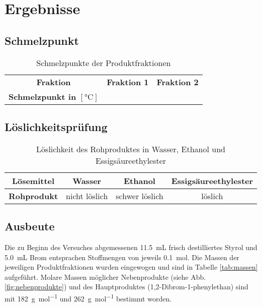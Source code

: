 \newpage
\section{Ergebnisse}
\label{sec:ergebnisse}

\subsection*{Schmelzpunkt}
\begin{table}[h!]
	\renewcommand*{\arraystretch}{1.2}
	\centering
	\caption{Schmelzpunkte der Produktfraktionen}
	\label{tab:schmelzpunkte}
	\begin{tabulary}{1.0\textwidth}{C|CC}
		\hline
		\textbf{Fraktion} & \textbf{Fraktion 1} & \textbf{Fraktion 2}\\
		\textbf{Schmelzpunkt in $\left[\si{\celsius}\right]$} &&\\
		\hline			
	\end{tabulary}
\end{table}%
\FloatBarrier

\subsection*{Löslichkeitsprüfung}

\begin{table}[h!]
	\renewcommand*{\arraystretch}{1.2}
	\centering
	\caption{Löslichkeit des Rohproduktes in Wasser, Ethanol und Essigsäureethylester}
	\label{tab:löslichkeit}
	\begin{tabulary}{1.0\textwidth}{C|C|C|C}
		\hline
		\textbf{Lösemittel} & \textbf{Wasser} & \textbf{Ethanol} & \textbf{Essigsäureethylester} \\
		\hline
		\textbf{Rohprodukt} & nicht löslich & schwer löslich & löslich\\
		\hline			
	\end{tabulary}
\end{table}%
\FloatBarrier

\subsection*{Ausbeute}
Die zu Beginn des Versuches abgemessenen \SI{11,5}{\milli \liter} frisch destilliertes Styrol und \SI{5,0}{\milli\liter} Brom entsprachen Stoffmengen von jeweils \SI{0,1}{\mol}. Die Massen der jeweiligen Produktfraktionen wurden eingewogen und sind in Tabelle \ref{tab:massen} aufgeführt. Molare Massen möglicher Nebenprodukte (siehe Abb. \ref{fig:nebenprodukte}) und des Hauptproduktes (1,2-Dibrom-1-phenylethan) sind mit \SI{182}{\gram \per \mole} und \SI{262}{\gram \per \mol} bestimmt worden.

